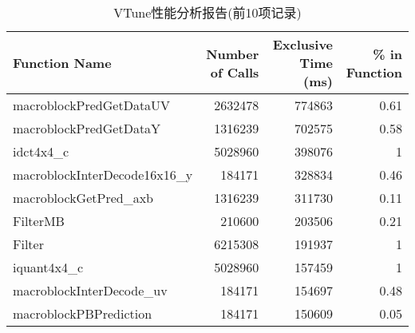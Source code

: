 \begin{table}[htbp]
  \centering
  \caption{VTune性能分析报告(前10项记录)}
  \label{tab:vtune10}
    \begin{tabular}{lrrr}
    \addlinespace
    \toprule[1.5pt]
    \textbf{Function Name} & \textbf{Number of Calls} & \textbf{Exclusive Time (ms)} & \textbf{\% in Function} \\
    \midrule[1pt]
    macroblockPredGetDataUV & 2632478 & 774863 & 0.61 \\
    macroblockPredGetDataY & 1316239 & 702575 & 0.58 \\
    idct4x4\_c & 5028960 & 398076 & 1 \\
    macroblockInterDecode16x16\_y & 184171 & 328834 & 0.46 \\
    macroblockGetPred\_axb & 1316239 & 311730 & 0.11 \\
    FilterMB & 210600 & 203506 & 0.21 \\
    Filter & 6215308 & 191937 & 1 \\
    iquant4x4\_c & 5028960 & 157459 & 1 \\
    macroblockInterDecode\_uv & 184171 & 154697 & 0.48 \\
    macroblockPBPrediction & 184171 & 150609 & 0.05 \\
    \bottomrule[1.5pt]
    \end{tabular}
\end{table}
